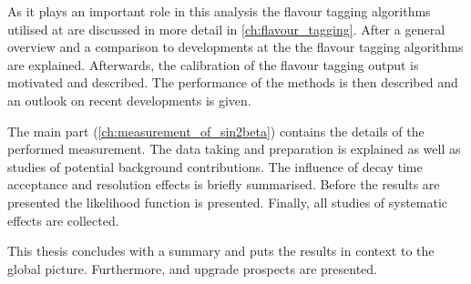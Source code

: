 As it plays an important role in this analysis the flavour tagging algorithms
utilised at \LHCb are discussed in more detail in \cref{ch:flavour_tagging}.
After a general overview and a comparison to developments at the \BFactories the
flavour tagging algorithms are explained. Afterwards, the calibration of the
flavour tagging output is motivated and described. The performance of the
methods is then described and an outlook on recent developments is given.

The main part (\cref{ch:measurement_of_sin2beta}) contains the details of the
performed measurement. The data taking and preparation is explained as well as
studies of potential background contributions. The influence of decay time
acceptance and resolution effects is briefly summarised. Before the results are
presented the likelihood function is presented. Finally, all studies of
systematic effects are collected.

This thesis concludes with a summary and puts the results in context to the
global \CKM picture. Furthermore, \RunTwo and \LHCb upgrade prospects are
presented.
